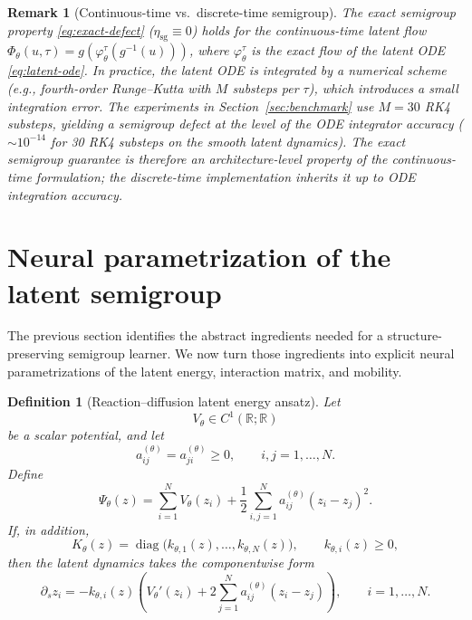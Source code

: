 \documentclass[11pt]{article}
\newtheorem{definition}{Definition}
\newtheorem{remark}{Remark}
\newcommand{\R}{\mathbb{R}}
\newcommand{\PhiT}{\Phi_{\theta}}
\newcommand{\diag}{\operatorname{diag}}
\begin{document}
\begin{remark}[Continuous-time vs.\ discrete-time semigroup]\label{rem:cont-vs-disc}
The exact semigroup property \eqref{eq:exact-defect} ($\eta_{\mathrm{sg}}\equiv 0$) holds for the continuous-time latent flow $\PhiT(u,\tau)=g(\varphi_{\theta}^{\tau}(g^{-1}(u)))$, where $\varphi_{\theta}^{\tau}$ is the exact flow of the latent ODE \eqref{eq:latent-ode}. In practice, the latent ODE is integrated by a numerical scheme (e.g., fourth-order Runge--Kutta with $M$ substeps per $\tau$), which introduces a small integration error. The experiments in Section~\ref{sec:benchmark} use $M=30$ RK4 substeps, yielding a semigroup defect at the level of the ODE integrator accuracy ($\sim 10^{-14}$ for 30 RK4 substeps on the smooth latent dynamics). The exact semigroup guarantee is therefore an architecture-level property of the continuous-time formulation; the discrete-time implementation inherits it up to ODE integration accuracy.
\end{remark}

\section{Neural parametrization of the latent semigroup}\label{sec:neural-param}
The previous section identifies the abstract ingredients needed for a structure-preserving semigroup learner. We now turn those ingredients into explicit neural parametrizations of the latent energy, interaction matrix, and mobility.
\begin{definition}[Reaction--diffusion latent energy ansatz]\label{def:rd-energy}
Let
\begin{equation}\label{eq:V-type}
V_{\theta}\in C^1(\R;\R)
\end{equation}
be a scalar potential, and let
\begin{equation}\label{eq:A-sym}
a_{ij}^{(\theta)}=a_{ji}^{(\theta)}\ge 0, \qquad i,j=1,\dots,N.
\end{equation}
Define
\begin{equation}\label{eq:rd-energy}
\Psi_{\theta}(z)=\sum_{i=1}^N V_{\theta}(z_i)+\frac12\sum_{i,j=1}^N a_{ij}^{(\theta)}(z_i-z_j)^2.
\end{equation}
If, in addition,
\begin{equation}\label{eq:diag-mobility}
K_{\theta}(z)=\diag\bigl(k_{\theta,1}(z),\dots,k_{\theta,N}(z)\bigr), \qquad k_{\theta,i}(z)\ge 0,
\end{equation}
then the latent dynamics takes the componentwise form
\begin{equation}\label{eq:component-flow}
\partial_s z_i=-k_{\theta,i}(z)\left(V_{\theta}'(z_i)+2\sum_{j=1}^N a_{ij}^{(\theta)}(z_i-z_j)\right), \qquad i=1,\dots,N.
\end{equation}
\end{definition}
\end{document}
